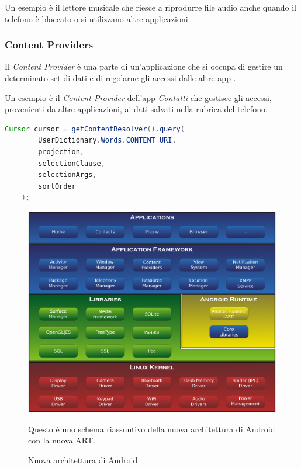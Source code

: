 Un esempio è il lettore musicale che riesce a riprodurre file audio anche quando il telefono è bloccato o si utilizzano altre applicazioni.

\subsubsection{Content Providers}
Il \textit{Content Provider} è una parte di un'applicazione che si occupa di gestire un determinato set di dati e di regolarne gli accessi dalle altre app \cite{androides}.

Un esempio è il \textit{Content Provider} dell'app \textit{Contatti} che gestisce gli accessi, provenienti da altre applicazioni, ai dati salvati nella rubrica del telefono.\\

\begin{lstlisting}[language=Java, caption=Esempio di codice scritto in Java per una richiesta al Content Provider di User Dictionary]
    Cursor cursor = getContentResolver().query(
        UserDictionary.Words.CONTENT_URI,  
        projection,                        
        selectionClause,                   
        selectionArgs,                     
        sortOrder
    );                        
\end{lstlisting}

\begin{figure}[H]
  \includegraphics[scale=0.35]{android/imgs/android_new.png}
  \caption{Nuova architettura di Android}
  Questo è uno schema riassuntivo della nuova architettura di Android con la nuova ART.
\end{figure}
